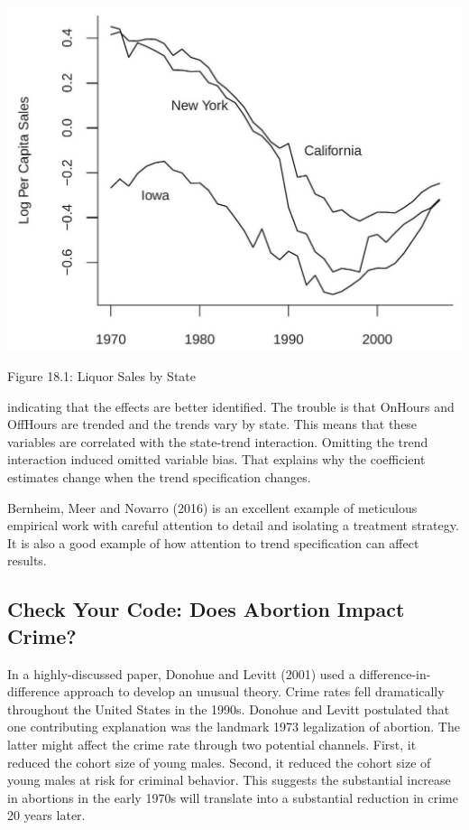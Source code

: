 \documentclass[10pt]{article}
\begin{document}
\includegraphics[max width=\textwidth]{2022_10_23_b5d26ddcd2ce17e8fbc5g-11}

Figure 18.1: Liquor Sales by State

indicating that the effects are better identified. The trouble is that OnHours and OffHours are trended and the trends vary by state. This means that these variables are correlated with the state-trend interaction. Omitting the trend interaction induced omitted variable bias. That explains why the coefficient estimates change when the trend specification changes.

Bernheim, Meer and Novarro (2016) is an excellent example of meticulous empirical work with careful attention to detail and isolating a treatment strategy. It is also a good example of how attention to trend specification can affect results.

\subsection{Check Your Code: Does Abortion Impact Crime?}
In a highly-discussed paper, Donohue and Levitt (2001) used a difference-in-difference approach to develop an unusual theory. Crime rates fell dramatically throughout the United States in the 1990s. Donohue and Levitt postulated that one contributing explanation was the landmark 1973 legalization of abortion. The latter might affect the crime rate through two potential channels. First, it reduced the cohort size of young males. Second, it reduced the cohort size of young males at risk for criminal behavior. This suggests the substantial increase in abortions in the early 1970s will translate into a substantial reduction in crime 20 years later.
\end{document}
